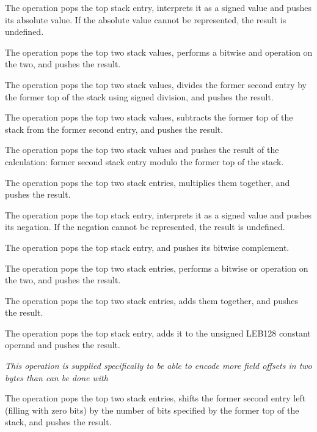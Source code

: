 \begin{enumerate}[1. ]
\itembfnl{\DWOPabsTARG}
The \DWOPabsTARG{} operation pops the top stack entry, interprets
it as a signed value and pushes its absolute value. If the
absolute value cannot be represented, the result is undefined.

\itembfnl{\DWOPandTARG}
The \DWOPandTARG{} operation pops the top two stack values, performs
a bitwise and operation on the two, and pushes the result.

\itembfnl{\DWOPdivTARG}
The \DWOPdivTARG{} operation pops the top two stack values, divides the former second entry by
the former top of the stack using signed division, and pushes the result.

\itembfnl{\DWOPminusTARG}
The \DWOPminusTARG{} operation pops the top two stack values, subtracts the former top of the
stack from the former second entry, and pushes the result.

\itembfnl{\DWOPmodTARG}
The \DWOPmodTARG{} operation pops the top two stack values and pushes the result of the
calculation: former second stack entry modulo the former top of the stack.

\itembfnl{\DWOPmulTARG}
The \DWOPmulTARG{} operation pops the top two stack entries, multiplies them together, and
pushes the result.

\itembfnl{\DWOPnegTARG}
The \DWOPnegTARG{} operation pops the top stack entry, interprets
it as a signed value and pushes its negation. If the negation
cannot be represented, the result is undefined.

\itembfnl{\DWOPnotTARG}
The \DWOPnotTARG{} operation pops the top stack entry, and pushes
its bitwise complement.

\itembfnl{\DWOPorTARG}
The \DWOPorTARG{} operation pops the top two stack entries, performs
a bitwise or operation on the two, and pushes the result.

\itembfnl{\DWOPplusTARG}
The \DWOPplusTARG{} operation pops the top two stack entries,
adds them together, and pushes the result.

\itembfnl{\DWOPplusuconstTARG}
The \DWOPplusuconstTARG{} operation pops the top stack entry,
adds it to the unsigned LEB128 constant operand and pushes
the result.

\textit{This operation is supplied specifically to be
able to encode more field offsets in two bytes than can be
done with
}

\itembfnl{\DWOPshlTARG}
The \DWOPshlTARG{} operation pops the top two stack entries,
shifts the former second entry left (filling with zero bits)
by the number of bits specified by the former top of the stack,
and pushes the result.


\end{enumerate}
